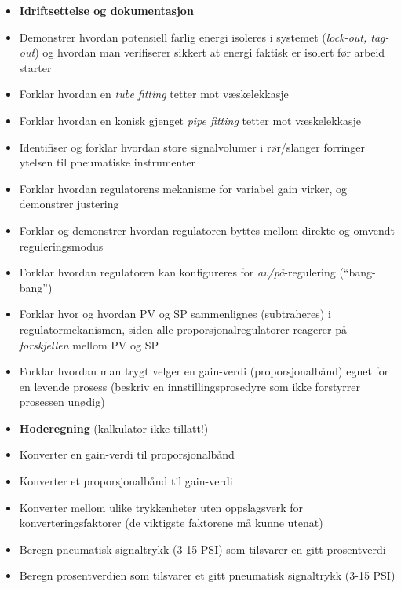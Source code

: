 \begin{itemize}
\item{} {\bf Idriftsettelse og dokumentasjon}
\item{} Demonstrer hvordan potensiell farlig energi isoleres i systemet ({\it lock-out, tag-out}) og hvordan man verifiserer sikkert at energi faktisk er isolert før arbeid starter
\item{} Forklar hvordan en {\it tube fitting} tetter mot væskelekkasje
\item{} Forklar hvordan en konisk gjenget {\it pipe fitting} tetter mot væskelekkasje
\item{} Identifiser og forklar hvordan store signalvolumer i rør/slanger forringer ytelsen til pneumatiske instrumenter
\item{} Forklar hvordan regulatorens mekanisme for variabel gain virker, og demonstrer justering
\item{} Forklar og demonstrer hvordan regulatoren byttes mellom direkte og omvendt reguleringsmodus
\item{} Forklar hvordan regulatoren kan konfigureres for {\it av/på}-regulering (``bang-bang'')
\item{} Forklar hvor og hvordan PV og SP sammenlignes (subtraheres) i regulatormekanismen, siden alle proporsjonalregulatorer reagerer på {\it forskjellen} mellom PV og SP
\item{} Forklar hvordan man trygt velger en gain-verdi (proporsjonalbånd) egnet for en levende prosess (beskriv en innstillingsprosedyre som ikke forstyrrer prosessen unødig)
\end{itemize}

\filbreak

\begin{itemize}
\item{} {\bf Hoderegning} (kalkulator ikke tillatt!)
\item{} Konverter en gain-verdi til proporsjonalbånd
\item{} Konverter et proporsjonalbånd til gain-verdi
\item{} Konverter mellom ulike trykkenheter uten oppslagsverk for konverteringsfaktorer (de viktigste faktorene må kunne utenat)
\item{} Beregn pneumatisk signaltrykk (3-15 PSI) som tilsvarer en gitt prosentverdi
\item{} Beregn prosentverdien som tilsvarer et gitt pneumatisk signaltrykk (3-15 PSI)
\end{itemize}

\filbreak

